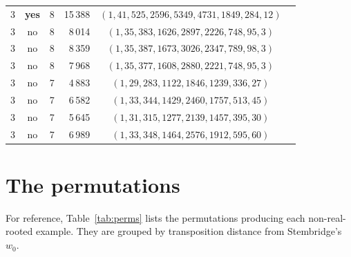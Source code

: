 \documentclass[11pt,reqno]{amsart}
\theoremstyle{definition}
\begin{document}
{\begin{longtable}{rccrcl}
\midrule

3 & \textbf{yes} & 8 & 15\,388 & $(1,41,525,2596,5349,4731,1849,284,12)$ \\
3 & no & 8 & 8\,014 & $(1,35,383,1626,2897,2226,748,95,3)$ \\
3 & no & 8 & 8\,359 & $(1,35,387,1673,3026,2347,789,98,3)$ \\
3 & no & 8 & 7\,968 & $(1,35,377,1608,2880,2221,748,95,3)$ \\

3 & no & 7 & 4\,883 & $(1,29,283,1122,1846,1239,336,27)$ \\
3 & no & 7 & 6\,582 & $(1,33,344,1429,2460,1757,513,45)$ \\
3 & no & 7 & 5\,645 & $(1,31,315,1277,2139,1457,395,30)$ \\
3 & no & 7 & 6\,989 & $(1,33,348,1464,2576,1912,595,60)$ \\

\end{longtable}
}


\section{The permutations}\label{sec:permutations}

For reference, Table~\ref{tab:perms} lists the permutations
producing each non-real-rooted example.  They are grouped by
transposition distance from Stembridge's $w_0$.
\end{document}
